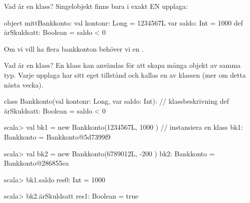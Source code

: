 
\begin{Slide}{Vad är en klass?}
Singelobjekt finns bara i exakt EN upplaga:
\begin{Code}
object mittBankkonto:
  val kontonr: Long        = 1234567L
  var saldo: Int           = 1000
  def ärSkuldsatt: Boolean = saldo < 0
\end{Code}
Om vi vill ha flera bankkonton behöver vi en  .
\end{Slide}

\begin{Slide}{Vad är en klass?}
En klass kan användas för att skapa många objekt av samma typ. Varje upplaga har sitt eget tillstånd och kallas en  av klassen (mer om detta nästa vecka).
\begin{Code}
class Bankkonto(val kontonr: Long, var saldo: Int): // klassbeskrivning
  def ärSkuldsatt: Boolean = saldo < 0
\end{Code}
\pause
\begin{REPL}
scala> val bk1 = new Bankkonto(1234567L, 1000 )   // instansiera en klass
bk1: Bankkonto = Bankkonto@5d7399f9

scala> val bk2 = new Bankkonto(6789012L, -200 )
bk2: Bankkonto = Bankkonto@286855ea

scala> bk1.saldo
res0: Int = 1000

scala> bk2.ärSkuldsatt
res1: Boolean = true
\end{REPL}
\end{Slide}

